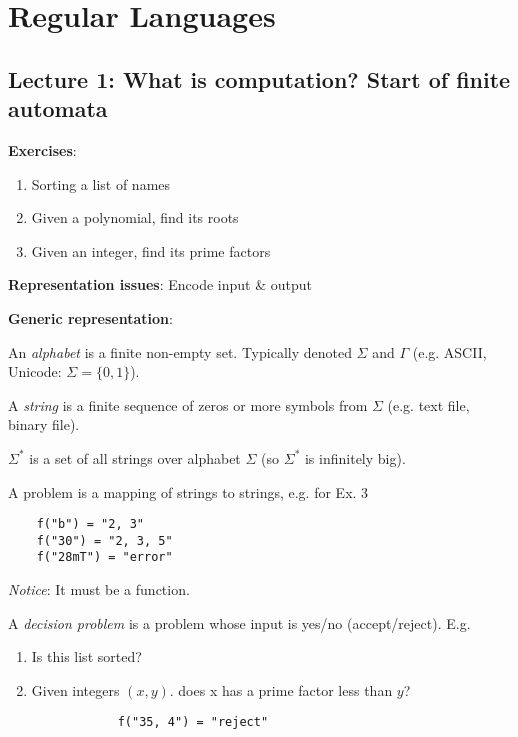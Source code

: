 
\chapter{Regular Languages}

\section*{Lecture 1: What is computation? Start of finite automata}

\textbf{Exercises}:

\begin{enumerate}
    \item Sorting a list of names
    \item Given a polynomial, find its roots
    \item Given an integer, find its prime factors
\end{enumerate}

\textbf{Representation issues}: Encode input \& output

\textbf{Generic representation}:

\begin{definition}
    An \emph{alphabet} is a finite non-empty set. Typically denoted $\Sigma$ and $\Gamma$ (e.g. ASCII, Unicode: $\Sigma = \{0, 1\}$).
\end{definition}

\begin{definition}
    A \emph{string} is a finite sequence of zeros or more symbols from $\Sigma$ (e.g. text file, binary file).
\end{definition}

\begin{definition}
    $\Sigma^*$ is a set of all strings over alphabet $\Sigma$ (so $\Sigma^*$ is infinitely big).
\end{definition}

A problem is a mapping of strings to strings, e.g. for Ex. 3

\begin{verbatim}
    f("b") = "2, 3"
    f("30") = "2, 3, 5"
    f("28mT") = "error"
\end{verbatim}

\emph{Notice}: It must be a function.

\begin{definition}
    A \emph{decision problem} is a problem whose input is yes/no (accept/reject). E.g.

    \begin{enumerate}
        \item Is this list sorted?
        \item Given integers $(x, y)$. does x has a prime factor less than $y$?

        \begin{verbatim}
            f("35, 4") = "reject"
        \end{verbatim}
    \end{enumerate}
\end{definition}

